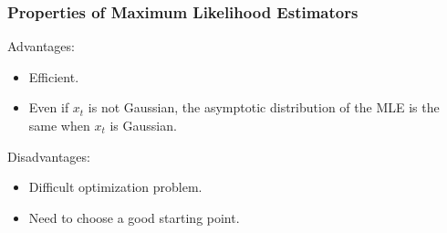 \documentclass[%
xcolor=pdftex]{beamer}
\begin{document}
\begin{frame}
\frametitle{Properties of Maximum Likelihood Estimators}

Advantages:

\begin{itemize}
\item Efficient.
\item Even if $x_t$ is not Gaussian, the asymptotic distribution of the MLE is the same when $x_t$ is Gaussian.
\end{itemize}

Disadvantages:

\begin{itemize}
\item Difficult optimization problem.
\item Need to choose a good starting point.
\end{itemize}

\end{frame}
\end{document}
